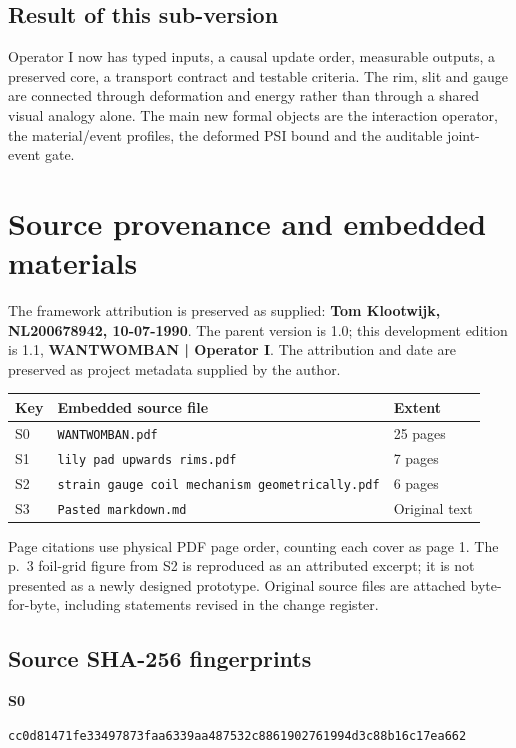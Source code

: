 \documentclass[10pt,a4paper]{article}
\numberwithin{equation}{section}
\newcommand{\newpart}{\clearpage}
\begin{document}
\subsection*{Result of this sub-version}
Operator I now has typed inputs, a causal update order, measurable outputs, a preserved core, a transport contract and testable criteria. The rim, slit and gauge are connected through deformation and energy rather than through a shared visual analogy alone. The main new formal objects are the interaction operator, the material/event profiles, the deformed PSI bound and the auditable joint-event gate.

\newpart
\appendix
\section{Source provenance and embedded materials}
\label{sec:provenance}
The framework attribution is preserved as supplied: \textbf{Tom Klootwijk, NL200678942, 10-07-1990}. The parent version is 1.0; this development edition is 1.1, \textbf{WANTWOMBAN | Operator I}. The attribution and date are preserved as project metadata supplied by the author.

\small
\begin{tabularx}{\linewidth}{@{}P{12mm}Y P{22mm}@{}}
\toprule
\textbf{Key} & \textbf{Embedded source file} & \textbf{Extent}\\
\midrule
S0 & \texttt{WANTWOMBAN.pdf} & 25 pages\\
S1 & \texttt{lily pad upwards rims.pdf} & 7 pages\\
S2 & \texttt{strain gauge coil mechanism geometrically.pdf} & 6 pages\\
S3 & \texttt{Pasted markdown.md} & Original text\\
\bottomrule
\end{tabularx}
\normalsize

Page citations use physical PDF page order, counting each cover as page 1. The p.~3 foil-grid figure from S2 is reproduced as an attributed excerpt; it is not presented as a newly designed prototype. Original source files are attached byte-for-byte, including statements revised in the change register.

\subsection*{Source SHA-256 fingerprints}
\small
\textbf{S0}\par\texttt{cc0d81471fe33497873faa6339aa487532c8861902761994d3c88b16c17ea662}
\end{document}
